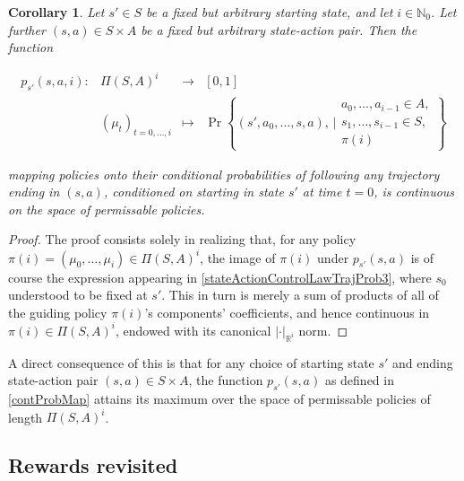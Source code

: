 \documentclass[11pt]{article} %
\newtheorem{cor}{Corollary}
\begin{document}
\begin{cor}\label{corContProbMap}
	Let $s' \in S$ be a fixed but arbitrary starting state, and let $i \in \mathbb{N}_0$. Let further $(s,a) \in S \times A$ be a fixed but arbitrary state-action pair. Then the function

\begin{equation}\label{contProbMap}
	\begin{array}{rccl}
		p_{s'}(s,a,i): 	& \Pi(S,A)^i 			& \rightarrow 	& [0,1] \\
					& (\mu_t)_{t=0,\dots,i} 	& \mapsto 	& \Pr\left\{  (s',a_0,\dots,s,a), \, \Bigg| \begin{array}{lr}
																					a_0, \dots, a_{i-1} \in A, \\
																					s_1,\dots,s_{i-1} \in S, \\
																					\pi(i)
																					\end{array} \right\}
	\end{array}
\end{equation}

mapping policies onto their conditional probabilities of following \textit{any} trajectory ending in $(s,a)$, conditioned on starting in state $s'$ at time $t=0$, is continuous on the space of permissable policies.
\end{cor}

\begin{proof}
	The proof consists solely in realizing that, for any policy $\pi(i) = (\mu_0,\dots,\mu_i) \in \Pi(S,A)^i$, the image of $\pi(i)$ under $p_{s'}(s,a)$ is of course the expression appearing in \ref{stateActionControlLawTrajProb3}, where $s_0$ understood to be fixed at $s'$. This in turn is merely a sum of products of all of the guiding policy $\pi(i)$'s components' coefficients, and hence continuous in $\pi(i) \in \Pi(S,A)^i$, endowed with its canonical $| \cdot |_{\mathbb{R}^i}$ norm.
\end{proof}

A direct consequence of this is that for any choice of starting state $s'$ and ending state-action pair $(s,a) \in S \times A$, the function $p_{s'}(s,a)$ as defined in \ref{contProbMap} attains its maximum over the space of permissable policies of length $\Pi(S,A)^i$.

\subsection{Rewards revisited}
\end{document}
